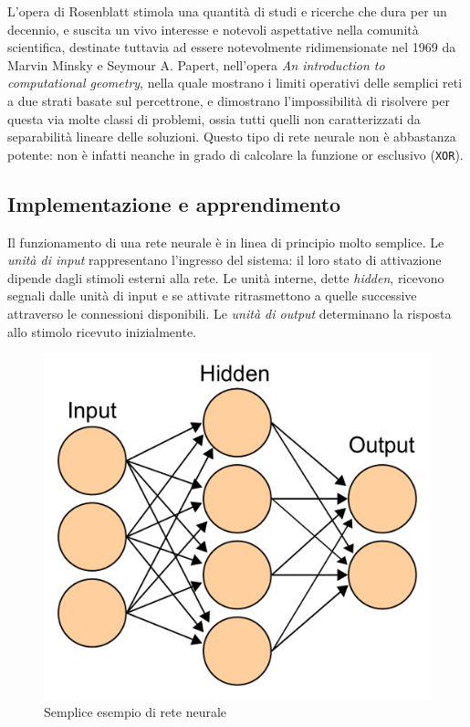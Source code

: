 L'opera di Rosenblatt stimola una quantità di studi e ricerche che dura per un decennio, e suscita un vivo interesse e notevoli aspettative nella comunità scientifica, destinate tuttavia ad essere notevolmente ridimensionate nel 1969 da Marvin Minsky e Seymour A. Papert, nell'opera \emph{An introduction to computational geometry}, nella quale mostrano i limiti operativi delle semplici reti a due strati basate sul percettrone, e dimostrano l'impossibilità di risolvere per questa via molte classi di problemi, ossia tutti quelli non caratterizzati da separabilità lineare delle soluzioni. Questo tipo di rete neurale non è abbastanza potente: non è infatti neanche in grado di calcolare la funzione or esclusivo (\texttt{XOR}).

\subsection{Implementazione e apprendimento}
Il funzionamento di una rete neurale è in linea di principio molto semplice. Le \emph{unità di input} rappresentano l’ingresso del sistema: il loro stato di attivazione dipende dagli stimoli esterni alla rete. Le unità interne, dette \emph{hidden}, ricevono segnali dalle unità di input e se attivate ritrasmettono a quelle successive attraverso le connessioni disponibili. Le \emph{unità di output} determinano la risposta allo stimolo ricevuto inizialmente.

\begin{figure}[hbt]
  \centering
  \includegraphics[width=.5\textwidth]{img/Artificial_neural_network}
  \caption{Semplice esempio di rete neurale}
  \label{fig:rete-neurale}
\end{figure}

